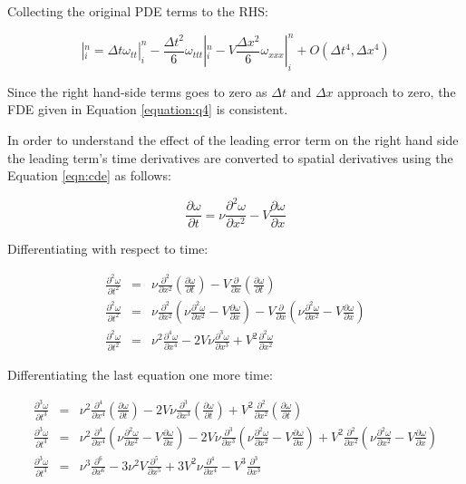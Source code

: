 \documentclass[letterpaper,12pt]{article}
\begin{document}
Collecting the original PDE terms to the RHS:

\begin{equation}
	[\omega_t + V\omega_x - \nu\omega_{xx}]|^n_i = \Delta t \omega_{tt}|^n_i - \frac{\Delta t^2}{6} \omega_{ttt}|^n_i - V\frac{\Delta x^2}{6}\omega_{xxx}|^n_i + O(\Delta t^4,\Delta x^4)
	\label{equation:consistency}
\end{equation}

Since the right hand-side terms goes to zero as $\Delta t$ and $\Delta x$ approach to zero, the FDE given
in Equation \ref{equation:q4} is consistent.

In order to understand the effect of the leading error term on the right hand side the leading term's time
derivatives are converted to spatial derivatives using the Equation \ref{eqn:cde} as follows:

\begin{equation}
	\frac{\partial \omega}{\partial t} = \nu\frac{\partial^2 \omega}{\partial x^2} - V\frac{\partial \omega}{\partial x}
\end{equation}

Differentiating with respect to time:

\begin{eqnarray}
	\frac{\partial^2 \omega}{\partial t^2} &=& \nu\frac{\partial^2}{\partial x^2}(\frac{\partial \omega}{\partial t}) - V\frac{\partial}{\partial x}(\frac{\partial \omega}{\partial t}) \nonumber \\
	\frac{\partial^2 \omega}{\partial t^2} &=& \nu\frac{\partial^2}{\partial x^2}(\nu\frac{\partial^2 \omega}{\partial x^2} - V\frac{\partial \omega}{\partial x}) - V\frac{\partial}{\partial x}(\nu\frac{\partial^2 \omega}{\partial x^2} - V\frac{\partial \omega}{\partial x}) \nonumber \\
	\frac{\partial^2 \omega}{\partial t^2} &=& \nu^2\frac{\partial^4 \omega}{\partial x^4} - 2V\nu\frac{\partial^3 \omega}{\partial x^3} + V^2\frac{\partial^2 \omega}{\partial x^2}
	\label{eqnarray:t2}
\end{eqnarray}

Differentiating the last equation one more time:

\begin{eqnarray}
	\frac{\partial^3 \omega}{\partial t^3} &=& \nu^2\frac{\partial^4}{\partial x^4}(\frac{\partial \omega}{\partial t}) - 2V\nu\frac{\partial^3}{\partial x^3}(\frac{\partial \omega}{\partial t}) + V^2\frac{\partial^2}{\partial x^2}(\frac{\partial \omega}{\partial t}) \nonumber \\
	\frac{\partial^3 \omega}{\partial t^3} &=& \nu^2\frac{\partial^4}{\partial x^4}(\nu\frac{\partial^2 \omega}{\partial x^2} - V\frac{\partial \omega}{\partial x}) - 2V\nu\frac{\partial^3}{\partial x^3}(\nu\frac{\partial^2 \omega}{\partial x^2} - V\frac{\partial \omega}{\partial x}) + V^2\frac{\partial^2}{\partial x^2}(\nu\frac{\partial^2 \omega}{\partial x^2} - V\frac{\partial \omega}{\partial x}) \nonumber \\
	\frac{\partial^3 \omega}{\partial t^3} &=& \nu^3\frac{\partial^6}{\partial x^6} - 3\nu^2V\frac{\partial^5}{\partial x^5} + 3V^2\nu\frac{\partial^4}{\partial x^4} - V^3\frac{\partial^3}{\partial x^3}
	\label{eqnarray:t3}
\end{eqnarray}
\end{document}
